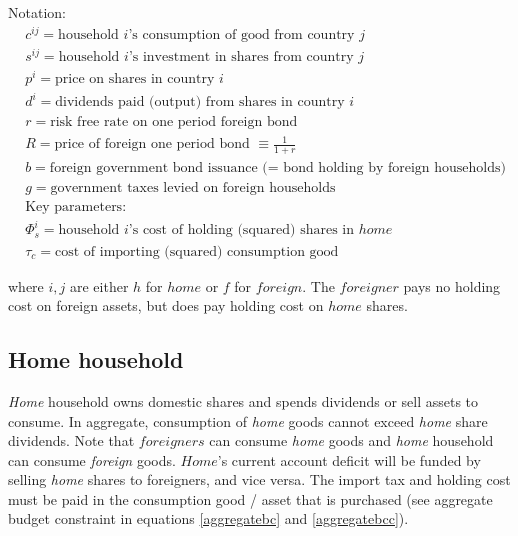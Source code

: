 \documentclass[a4paper]{article}
\begin{document}
Notation: 
\begin{align*}
&c^{ij} = \text{household } i \text{'s consumption of good from country } j \\
&s^{ij} = \text{household } i \text{'s investment in shares from country } j \\
&p^{i} = \text{price on shares in country } i \\
&d^{i} = \text{dividends paid (output) from shares in country } i\\
&r = \text{risk free rate on one period foreign bond}\\
&R = \text{price of foreign one period bond }\equiv \frac{1}{1+r}\\
&b = \text{foreign government bond issuance (= bond holding by foreign households)}\\
&g = \text{government taxes levied on foreign households}\\
&\text{Key parameters:}\\
&\Phi^{i}_s = \text{household } i \text{'s cost of holding (squared) shares in }home\\
&\tau_c = \text{cost of importing (squared) consumption good }
\end{align*}

where $i,j$ are either $h$ for $home$ or $f$ for $foreign$. The $foreigner$ pays no holding cost on foreign assets, but does pay holding cost on $home$ shares. 


\subsection{Home household}
\emph{Home} household owns domestic shares and spends dividends or sell assets to consume. In aggregate, consumption of \emph{home} goods cannot exceed \emph{home} share dividends. Note that $foreigners$ can consume \emph{home} goods and \emph{home} household can consume \emph{foreign} goods. $Home$'s current account deficit will be funded by selling \emph{home} shares to foreigners, and vice versa. The import tax and holding cost must be paid in the consumption good / asset that is purchased (see aggregate budget constraint in equations \ref{aggregatebc} and \ref{aggregatebcc}).
 
\linebreak
\linebreak
\end{document}
